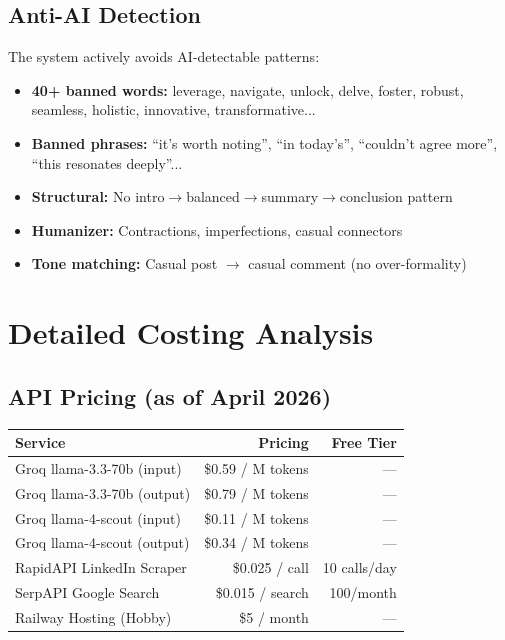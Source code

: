 \documentclass[12pt,a4paper]{article}
\begin{document}
\subsection{Anti-AI Detection}

The system actively avoids AI-detectable patterns:

\begin{itemize}[leftmargin=1.5em]
    \item \textbf{40+ banned words:} leverage, navigate, unlock, delve, foster, robust, seamless, holistic, innovative, transformative...
    \item \textbf{Banned phrases:} ``it's worth noting'', ``in today's'', ``couldn't agree more'', ``this resonates deeply''...
    \item \textbf{Structural:} No intro$\rightarrow$balanced$\rightarrow$summary$\rightarrow$conclusion pattern
    \item \textbf{Humanizer:} Contractions, imperfections, casual connectors
    \item \textbf{Tone matching:} Casual post $\rightarrow$ casual comment (no over-formality)
\end{itemize}

\section{Detailed Costing Analysis}

\subsection{API Pricing (as of April 2026)}

\begin{center}
\begin{tabularx}{\textwidth}{Xrr}
\toprule
\textbf{Service} & \textbf{Pricing} & \textbf{Free Tier} \\
\midrule
Groq llama-3.3-70b (input) & \$0.59 / M tokens & --- \\
Groq llama-3.3-70b (output) & \$0.79 / M tokens & --- \\
Groq llama-4-scout (input) & \$0.11 / M tokens & --- \\
Groq llama-4-scout (output) & \$0.34 / M tokens & --- \\
RapidAPI LinkedIn Scraper & \$0.025 / call & 10 calls/day \\
SerpAPI Google Search & \$0.015 / search & 100/month \\
Railway Hosting (Hobby) & \$5 / month & --- \\
\bottomrule
\end{tabularx}
\end{center}
\end{document}
